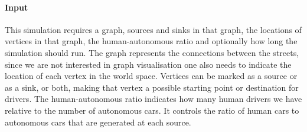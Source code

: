 \paragraph{Input}
\label{par:method:model:details:input}
This simulation requires a graph, sources and sinks in that graph, the locations of vertices in that graph, the human-autonomous ratio and optionally how long the simulation should run. The graph represents the connections between the streets, since we are not interested in graph visualisation one also needs to indicate the location of each vertex in the world space. Vertices can be marked as a source or as a sink, or both, making that vertex a possible starting point or destination for drivers. The human-autonomous ratio indicates how many human drivers we have relative to the number of autonomous cars. It controls the ratio of human cars to autonomous cars that are generated at each source.